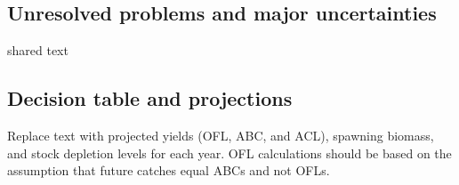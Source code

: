 \documentclass[11pt,
  english,
  letterpaper,
]{article}
\begin{document}
\hypertarget{unresolved-problems-and-major-uncertainties}{%
\subsection*{Unresolved problems and major uncertainties}\label{unresolved-problems-and-major-uncertainties}}

shared text

\hypertarget{decision-table-and-projections}{%
\subsection*{Decision table and projections}\label{decision-table-and-projections}}

Replace text with projected yields (OFL, ABC, and ACL), spawning biomass, and stock depletion levels for each year. OFL calculations should be based on the assumption that future catches equal ABCs and not OFLs.

\begingroup\fontsize{10}{12}\selectfont
\end{document}
